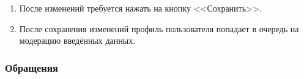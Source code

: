 \documentclass{../includes/TechDoc}
\begin{document}
\begin{enumerate}
        \item После изменений требуется нажать на кнопку <<Сохранить>>.
        \item После сохранения изменений профиль пользователя попадает в очередь на модерацию введённых данных.

    \end{enumerate}

    \clearpage

    \subsubsection{Обращения}

    \begin{figure}[ht]
        \begin{center}
            \begin{minipage}[h]{0.32\linewidth}

\end{minipage}
\end{center}
\end{figure}
\end{document}
